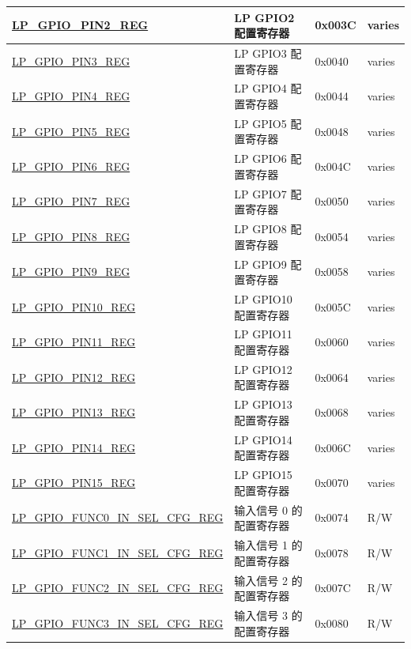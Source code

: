 \begin{longtable}{ | p{6.2cm} | p{6.9cm} | p{1.3cm} | p{1.8cm} | }
\hyperref[regdesc:LPGPIOPINNREG]{LP\_GPIO\_PIN2\_REG} & LP GPIO2 配置寄存器 & 0x003C & varies \\ \hline
\hyperref[regdesc:LPGPIOPINNREG]{LP\_GPIO\_PIN3\_REG} & LP GPIO3 配置寄存器 & 0x0040 & varies \\ \hline
\hyperref[regdesc:LPGPIOPINNREG]{LP\_GPIO\_PIN4\_REG} & LP GPIO4 配置寄存器 & 0x0044 & varies \\ \hline
\hyperref[regdesc:LPGPIOPINNREG]{LP\_GPIO\_PIN5\_REG} & LP GPIO5 配置寄存器 & 0x0048 & varies \\ \hline
\hyperref[regdesc:LPGPIOPINNREG]{LP\_GPIO\_PIN6\_REG} & LP GPIO6 配置寄存器 & 0x004C & varies \\ \hline
\hyperref[regdesc:LPGPIOPINNREG]{LP\_GPIO\_PIN7\_REG} & LP GPIO7 配置寄存器 & 0x0050 & varies \\ \hline
\hyperref[regdesc:LPGPIOPINNREG]{LP\_GPIO\_PIN8\_REG} & LP GPIO8 配置寄存器 & 0x0054 & varies \\ \hline
\hyperref[regdesc:LPGPIOPINNREG]{LP\_GPIO\_PIN9\_REG} & LP GPIO9 配置寄存器 & 0x0058 & varies \\ \hline
\hyperref[regdesc:LPGPIOPINNREG]{LP\_GPIO\_PIN10\_REG} & LP GPIO10 配置寄存器 & 0x005C & varies \\ \hline
\hyperref[regdesc:LPGPIOPINNREG]{LP\_GPIO\_PIN11\_REG} & LP GPIO11 配置寄存器 & 0x0060 & varies \\ \hline
\hyperref[regdesc:LPGPIOPINNREG]{LP\_GPIO\_PIN12\_REG} & LP GPIO12 配置寄存器 & 0x0064 & varies \\ \hline
\hyperref[regdesc:LPGPIOPINNREG]{LP\_GPIO\_PIN13\_REG} & LP GPIO13 配置寄存器 & 0x0068 & varies \\ \hline
\hyperref[regdesc:LPGPIOPINNREG]{LP\_GPIO\_PIN14\_REG} & LP GPIO14 配置寄存器 & 0x006C & varies \\ \hline
\hyperref[regdesc:LPGPIOPINNREG]{LP\_GPIO\_PIN15\_REG} & LP GPIO15 配置寄存器 & 0x0070 & varies \\ \hline
\hyperref[regdesc:LPGPIOFUNCNINSELCFGREG]{LP\_GPIO\_FUNC0\_IN\_SEL\_CFG\_REG} & 输入信号 0 的配置寄存器& 0x0074 & R/W \\ \hline
\hyperref[regdesc:LPGPIOFUNCNINSELCFGREG]{LP\_GPIO\_FUNC1\_IN\_SEL\_CFG\_REG} & 输入信号 1 的配置寄存器 & 0x0078 & R/W \\ \hline
\hyperref[regdesc:LPGPIOFUNCNINSELCFGREG]{LP\_GPIO\_FUNC2\_IN\_SEL\_CFG\_REG} & 输入信号 2 的配置寄存器 & 0x007C & R/W \\ \hline
\hyperref[regdesc:LPGPIOFUNCNINSELCFGREG]{LP\_GPIO\_FUNC3\_IN\_SEL\_CFG\_REG} & 输入信号 3 的配置寄存器 & 0x0080 & R/W \\ \hline

\end{longtable}
